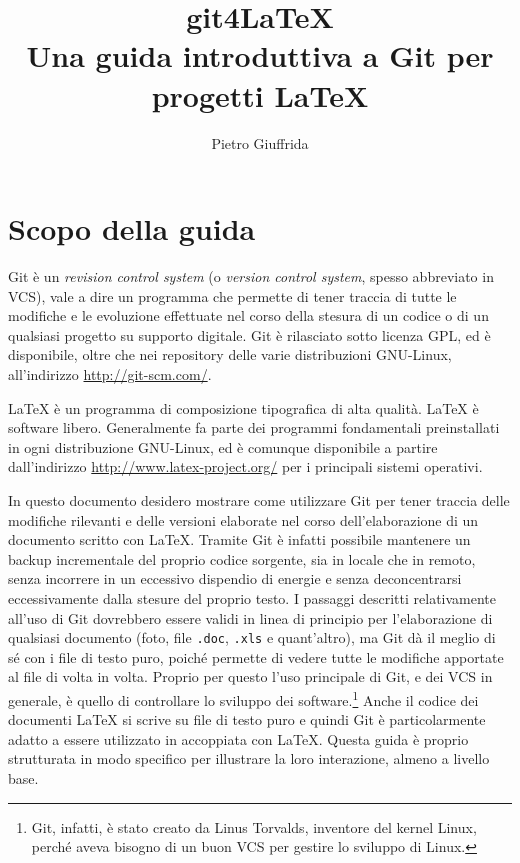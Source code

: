 \documentclass[a4paper,12pt,oneside]{article}
\begin{document}
\title{git4\LaTeX \\
  Una guida introduttiva a Git per progetti \LaTeX}
\author{Pietro Giuffrida}
\maketitle
\clearpage
\tableofcontents
\clearpage
\section{Scopo della guida}
Git è un \emph{revision control system} (o \emph{version control system}, spesso
abbreviato in VCS), vale a dire un programma che permette di tener traccia di
tutte le modifiche e le evoluzione effettuate nel corso della stesura di un
codice o di un qualsiasi progetto su supporto digitale. Git è rilasciato sotto
licenza GPL, ed è disponibile, oltre che nei repository delle varie distribuzioni
GNU-Linux, all'indirizzo \url{http://git-scm.com/}.

\LaTeX{} è un programma di composizione tipografica di alta qualità. \LaTeX{} è
software libero. Generalmente fa parte dei programmi fondamentali preinstallati in
ogni distribuzione GNU-Linux, ed è comunque disponibile a partire dall'indirizzo
\url{http://www.latex-project.org/} per i principali sistemi operativi.

In questo documento desidero mostrare come utilizzare Git per tener traccia
delle modifiche rilevanti e delle versioni elaborate nel corso dell'elaborazione
di un documento scritto con \LaTeX. Tramite Git è infatti possibile mantenere un
backup incrementale del proprio codice sorgente, sia in locale che in remoto,
senza incorrere in un eccessivo dispendio di energie e senza deconcentrarsi
eccessivamente dalla stesure del proprio testo. I passaggi descritti
relativamente all'uso di Git dovrebbero essere validi in linea di principio per
l'elaborazione di qualsiasi documento (foto, file \lstinline|.doc|, \lstinline|.xls|
e quant'altro), ma Git dà il meglio di sé con i file di testo puro, poiché permette
di vedere tutte le modifiche apportate al file di volta in volta. Proprio per questo
l'uso principale di Git, e dei VCS in generale, è quello di controllare lo sviluppo
dei software.\footnote{Git, infatti, è stato creato da Linus Torvalds, inventore
  del kernel Linux, perché aveva bisogno di un buon VCS per gestire lo sviluppo
  di Linux.} Anche il codice dei documenti \LaTeX{} si scrive su file di testo
puro e quindi Git è particolarmente adatto a essere utilizzato in accoppiata con
\LaTeX. Questa guida è proprio strutturata in modo specifico per illustrare la
loro interazione, almeno a livello base.
\end{document}
